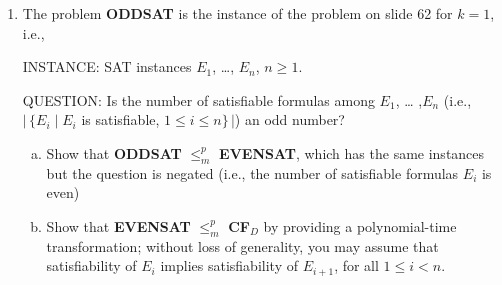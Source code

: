 \documentclass[11pt,a4paper]{article}
\begin{document}
\begin{enumerate}
%
%
%

\newpage


\item The problem {\bf ODDSAT} is the instance of the problem on
  slide 62 for $k=1$, i.e.,

\smallskip

INSTANCE: SAT instances  $E_1$, \ldots, $E_n$,  $n\geq 1$.

\smallskip

QUESTION: Is the number of satisfiable formulas among $E_1$, \ldots
,$E_n$  (i.e., $|\,\{ E_i \mid  E_i$ is satisfiable, $1\leq i \leq n\}\,|$)
an odd number?  

\begin{enumerate}[(a)]
\item Show that  {\bf ODDSAT} $\leq^p_m$ {\bf EVENSAT}, which has
the same instances but the question is negated (i.e., the number of
satisfiable formulas $E_i$ is even)

\item Show that {\bf EVENSAT} $\leq^p_m$ {\bf CF}$_D$ by providing a
polynomial-time transformation; without
loss of generality, you may assume that satisfiability of $E_i$ implies satisfiability of $E_{i+1}$, for 
all $1\leq i < n$.
\end{enumerate}


\end{enumerate}
\end{document}
